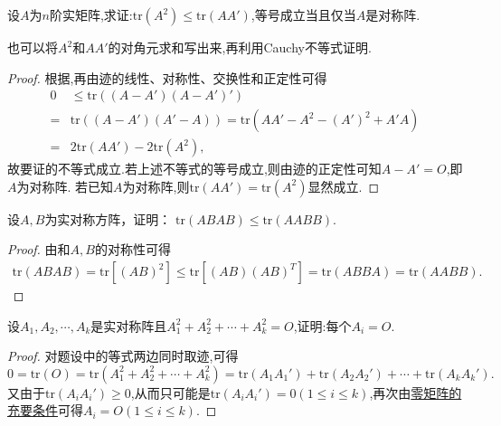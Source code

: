 \documentclass[../../main.tex]{subfiles}%
\begin{document}
\begin{proposition}\label{proposition:矩阵迹的不等式}
设\(A\)为\(n\)阶实矩阵,求证:\(\mathrm{tr}(A^2)\leqslant \mathrm{tr}(AA')\),等号成立当且仅当\(A\)是对称阵.
\end{proposition}
\begin{note}
也可以将$A^2$和$AA'$的对角元求和写出来,再利用Cauchy不等式证明.
\end{note}
\begin{proof}

根据,再由迹的线性、对称性、交换性和正定性可得
\begin{align*}
0&\leqslant \mathrm{tr}((A - A')(A - A')')\\
=&\mathrm{tr}((A - A')(A' - A))=\mathrm{tr}(AA' - A^2 - (A')^2 + A'A)\\
=&2\mathrm{tr}(AA') - 2\mathrm{tr}(A^2),
\end{align*}
故要证的不等式成立.若上述不等式的等号成立,则由迹的正定性可知\(A - A' = O\),即\(A\)为对称阵.
若已知$A$为对称阵,则$\mathrm{tr}(AA') = \mathrm{tr}(A^2)$显然成立.

\end{proof}

\begin{example}
设$A,B$为实对称方阵，证明：
$\mathrm{tr}\left( ABAB \right) \leqslant \mathrm{tr}\left( AABB \right) .$
\end{example}
\begin{proof}

由和$A,B$的对称性可得
\begin{align*}
\mathrm{tr}\left( ABAB \right) =\mathrm{tr}\left[ \left( AB \right) ^2 \right] \leqslant \mathrm{tr}\left[ \left( AB \right) \left( AB \right) ^T \right] =\mathrm{tr}\left( ABBA \right) =\mathrm{tr}\left( AABB \right) .
\end{align*}

\end{proof}

\begin{example}
设\(A_1,A_2,\cdots,A_k\)是实对称阵且\(A_1^2 + A_2^2+\cdots+A_k^2 = O\),证明:每个\(A_i = O\).
\end{example}
\begin{proof}

对题设中的等式两边同时取迹,可得
\[
0=\mathrm{tr}(O)=\mathrm{tr}(A_1^2 + A_2^2+\cdots+A_k^2)=\mathrm{tr}(A_1A_1')+\mathrm{tr}(A_2A_2')+\cdots+\mathrm{tr}(A_kA_k').
\]
又由于\(\mathrm{tr}(A_iA_i')\geqslant 0\),从而只可能是\(\mathrm{tr}(A_iA_i') = 0(1\leqslant  i\leqslant  k)\),再次由\hyperref[proposition:零矩阵的充要条件]{零矩阵的充要条件}可得\(A_i = O(1\leqslant  i\leqslant  k)\).

\end{proof}
\end{document}
